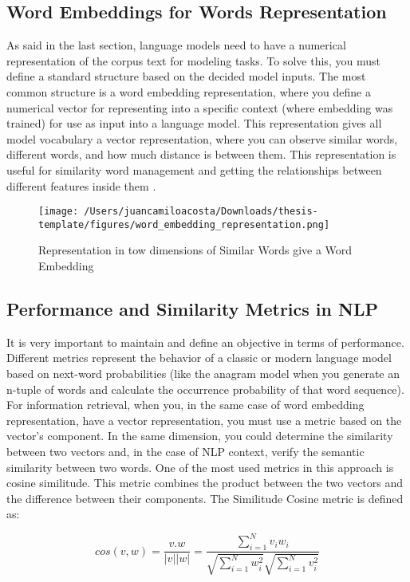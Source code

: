 \subsection{Word Embeddings for Words Representation}
As said in the last section, language models need to have a numerical representation of the corpus text for modeling tasks. To solve this, you must define a standard structure based on the decided model inputs. The most common structure is a word embedding representation, where you define a numerical vector for representing into a specific context (where embedding was trained) for use as input into a language model. This representation gives all model vocabulary a vector representation, where you can observe similar words, different words, and how much distance is between them. This representation is useful for similarity word management and getting the relationships between different features inside them \citet{nlp-fundamentals}. 

    \begin{figure}[H]
    \centering
    \texttt{[image: /Users/juancamiloacosta/Downloads/thesis-template/figures/word\_embedding\_representation.png]}
    \caption{Representation in tow dimensions of Similar Words give a Word Embedding \citet{nlp-fundamentals} }
    \label{fig:word-embedding}
    \end{figure}

\subsection{Performance and Similarity Metrics in NLP}
It is very important to maintain and define an objective in terms of performance. Different metrics represent the behavior of a classic or modern language model based on next-word probabilities (like the anagram model when you generate an n-tuple of words and calculate the occurrence probability of that word sequence). For information retrieval, when you, in the same case of word embedding representation, have a vector representation, you must use a metric based on the vector's component. In the same dimension, you could determine the similarity between two vectors and, in the case of NLP context, verify the semantic similarity between two words. One of the most used metrics in this approach is cosine similitude. This metric combines the product between the two vectors and the difference between their components. The Similitude Cosine metric is defined as:

\begin{equation}
cos(v,w) = \frac{v.w}{|v||w|} = \frac{\sum_{i=1}^{N} v_{i}w_{i}}{\sqrt{\sum_{i=1}^{N} w_{i}^{2}} \sqrt{\sum_{i=1}^{N} v_{i}^{2}}}
\end{equation}

